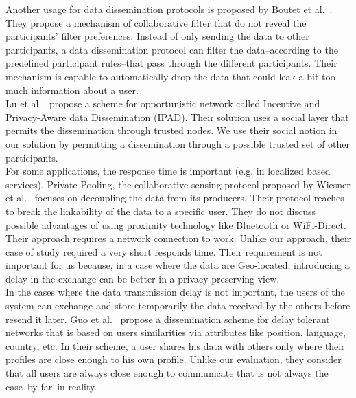 Another usage for data dissemination protocols is proposed by Boutet et al.~\cite{DBLP:journals/computing/BoutetFGJK16}.
They propose a mechanism of collaborative filter that do not reveal the participants' filter preferences.
Instead of only sending the data to other participants, a data dissemination protocol can filter the data--according to the predefined participant rules--that pass through the different participants.
Their mechanism is capable to automatically drop the data that could leak a bit too much information about a user.
\\

Lu et al.~\cite{DBLP:conf/infocom/LuLSCS13} propose a scheme for opportunistic network called Incentive and Privacy-Aware data Dissemination (IPAD).
Their solution uses a social layer that permits the dissemination through trusted nodes.
We use their social notion in our solution by permitting a dissemination through a possible trusted set of other participants.
\\

For some applications, the response time is important (e.g. in localized based services).
Private Pooling, the collaborative sensing protocol proposed by Wiesner et al.~\cite{DBLP:conf/mobisec/WiesnerDD11} focuses on decoupling the data from its producers.
Their protocol reaches to break the linkability of the data to a specific user.
They do not discuss possible advantages of using proximity technology like Bluetooth or WiFi-Direct.
Their approach requires a network connection to work.
Unlike our approach, their case of study required a very short responds time.
Their requirement is not important for us because, in a case where the data are Geo-located, introducing a delay in the exchange can be better in a privacy-preserving view.
\\

In the cases where the data transmission delay is not important, the users of the system can exchange and store temporarily the data received by the others before resend it later.
Guo et al.~\cite{DBLP:conf/infocom/GuoZYF13} propose a dissemination scheme for delay tolerant networks that is based on users similarities via attributes like position, language, country, etc.
In their scheme, a user shares his data with others only where their profiles are close enough to his own profile.
Unlike our evaluation, they consider that all users are always close enough to communicate that is not always the case--by far--in reality.
\\

